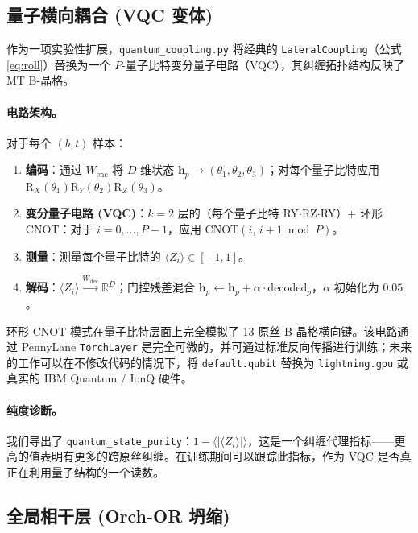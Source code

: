 \documentclass[11pt]{article}
\theoremstyle{definition}
\newcommand{\RR}{\mathbb{R}}
\newcommand{\vh}{\mathbf{h}}
\begin{document}
\subsection{量子横向耦合 (VQC 变体)}
\label{sec:quantum}

作为一项实验性扩展，\texttt{quantum\_coupling.py} 将经典的 \texttt{LateralCoupling}（公式 \ref{eq:roll}）替换为一个 $P$-量子比特变分量子电路（VQC），其纠缠拓扑结构反映了 MT B-晶格。

\paragraph{电路架构。}
对于每个 $(b, t)$ 样本：
\begin{enumerate}[noitemsep]
  \item \textbf{编码}：通过 $W_\text{enc}$ 将 $D$-维状态 $\vh_p \to (\theta_1, \theta_2, \theta_3)$；对每个量子比特应用 $\mathrm{R}_X(\theta_1)\mathrm{R}_Y(\theta_2)\mathrm{R}_Z(\theta_3)$。
  \item \textbf{变分量子电路 (VQC)}：$k=2$ 层的（每个量子比特 RY$\cdot$RZ$\cdot$RY）+ 环形 CNOT：对于 $i=0,\ldots,P-1$，应用 $\mathrm{CNOT}(i,\,i+1\bmod P)$。
  \item \textbf{测量}：测量每个量子比特的 $\langle Z_i\rangle\in[-1,1]$。
  \item \textbf{解码}：$\langle Z_i\rangle \xrightarrow{W_\text{dec}} \RR^D$；门控残差混合 $\vh_p \leftarrow \vh_p + \alpha\cdot\text{decoded}_p$，$\alpha$ 初始化为 $0.05$。
\end{enumerate}
环形 CNOT 模式在量子比特层面上完全模拟了 13 原丝 B-晶格横向键。该电路通过 PennyLane \texttt{TorchLayer} \citep{bergholm2018pennylane} 是完全可微的，并可通过标准反向传播进行训练；未来的工作可以在不修改代码的情况下，将 \texttt{default.qubit} 替换为 \texttt{lightning.gpu} 或真实的 IBM Quantum / IonQ 硬件。

\paragraph{纯度诊断。}
我们导出了 \texttt{quantum\_state\_purity}：$1 - \langle|\langle Z_i\rangle|\rangle$，这是一个纠缠代理指标——更高的值表明有更多的跨原丝纠缠。在训练期间可以跟踪此指标，作为 VQC 是否真正在利用量子结构的一个读数。

\subsection{全局相干层 (Orch-OR 坍缩)}
\label{sec:coherence}
\end{document}
